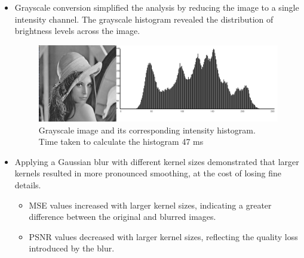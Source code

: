 \documentclass[a4paper,12pt]{article}
\begin{document}
\begin{itemize}
    \item Grayscale conversion simplified the analysis by reducing the image to a single intensity channel. The grayscale histogram revealed the distribution of brightness levels across the image.
    \begin{figure}[H]
        \centering
        \includegraphics[width=0.8\linewidth]{lena_gsh.png}
        \caption{Grayscale image and its corresponding intensity histogram.\\
        Time taken to calculate the histogram 47 ms}
        \label{fig:gsh}
    \end{figure}
    \item Applying a Gaussian blur with different kernel sizes demonstrated that larger kernels resulted in more pronounced smoothing, at the cost of losing fine details.
    \begin{itemize}
        \item MSE values increased with larger kernel sizes, indicating a greater difference between the original and blurred images.
        \item PSNR values decreased with larger kernel sizes, reflecting the quality loss introduced by the blur.
    \end{itemize}
    

\end{itemize}
\end{document}
